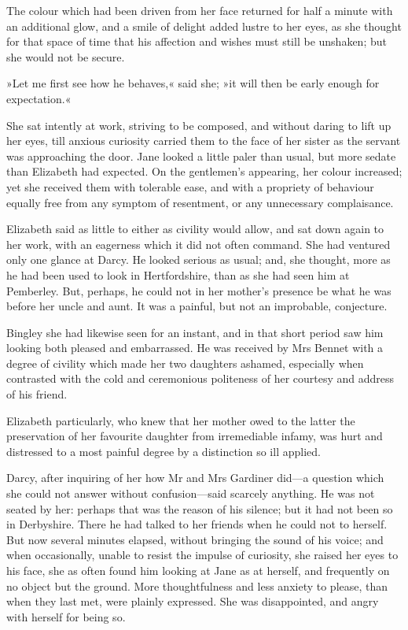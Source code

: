 The colour which had been driven from her face returned for half a minute with an additional glow, and a smile of delight added lustre to her eyes, as she thought for that space of time that his affection and wishes must still be unshaken; but she would not be secure.

»Let me first see how he behaves,« said she; »it will then be early enough for expectation.«

She sat intently at work, striving to be composed, and without daring to lift up her eyes, till anxious curiosity carried them to the face of her sister as the servant was approaching the door. Jane looked a little paler than usual, but more sedate than Elizabeth had expected. On the gentlemen's appearing, her colour increased; yet she received them with tolerable ease, and with a propriety of behaviour equally free from any symptom of resentment, or any unnecessary complaisance.

Elizabeth said as little to either as civility would allow, and sat down again to her work, with an eagerness which it did not often command. She had ventured only one glance at Darcy. He looked serious as usual; and, she thought, more as he had been used to look in Hertfordshire, than as she had seen him at Pemberley. But, perhaps, he could not in her mother's presence be what he was before her uncle and aunt. It was a painful, but not an improbable, conjecture.

Bingley she had likewise seen for an instant, and in that short period saw him looking both pleased and embarrassed. He was received by Mrs Bennet with a degree of civility which made her two daughters ashamed, especially when contrasted with the cold and ceremonious politeness of her courtesy and address of his friend.

Elizabeth particularly, who knew that her mother owed to the latter the preservation of her favourite daughter from irremediable infamy, was hurt and distressed to a most painful degree by a distinction so ill applied.

Darcy, after inquiring of her how Mr and Mrs Gardiner did—a question which she could not answer without confusion—said scarcely anything. He was not seated by her: perhaps that was the reason of his silence; but it had not been so in Derbyshire. There he had talked to her friends when he could not to herself. But now several minutes elapsed, without bringing the sound of his voice; and when occasionally, unable to resist the impulse of curiosity, she raised her eyes to his face, she as often found him looking at Jane as at herself, and frequently on no object but the ground. More thoughtfulness and less anxiety to please, than when they last met, were plainly expressed. She was disappointed, and angry with herself for being so.

